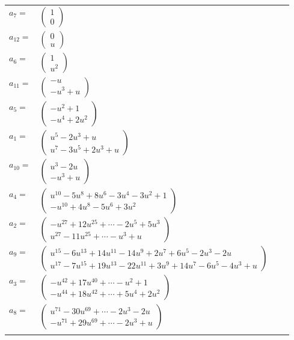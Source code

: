 \documentclass[1p]{elsarticle_modified}
\theoremstyle{definition}
\begin{document}
\begin{tabular}{m{7pt} m{180pt} m{7pt} m{180pt} }
\flushright $a_{7}=$&$\begin{pmatrix}1\\0\end{pmatrix}$ \\
\flushright $a_{12}=$&$\begin{pmatrix}0\\u\end{pmatrix}$ \\
\flushright $a_{6}=$&$\begin{pmatrix}1\\u^2\end{pmatrix}$ \\
\flushright $a_{11}=$&$\begin{pmatrix}- u\\- u^3+u\end{pmatrix}$ \\
\flushright $a_{5}=$&$\begin{pmatrix}- u^2+1\\- u^4+2 u^2\end{pmatrix}$ \\
\flushright $a_{1}=$&$\begin{pmatrix}u^5-2 u^3+u\\u^7-3 u^5+2 u^3+u\end{pmatrix}$ \\
\flushright $a_{10}=$&$\begin{pmatrix}u^3-2 u\\- u^3+u\end{pmatrix}$ \\
\flushright $a_{4}=$&$\begin{pmatrix}u^{10}-5 u^8+8 u^6-3 u^4-3 u^2+1\\- u^{10}+4 u^8-5 u^6+3 u^2\end{pmatrix}$ \\
\flushright $a_{2}=$&$\begin{pmatrix}- u^{27}+12 u^{25}+\cdots-2 u^5+5 u^3\\u^{27}-11 u^{25}+\cdots- u^3+u\end{pmatrix}$ \\
\flushright $a_{9}=$&$\begin{pmatrix}u^{15}-6 u^{13}+14 u^{11}-14 u^9+2 u^7+6 u^5-2 u^3-2 u\\u^{17}-7 u^{15}+19 u^{13}-22 u^{11}+3 u^9+14 u^7-6 u^5-4 u^3+u\end{pmatrix}$ \\
\flushright $a_{3}=$&$\begin{pmatrix}- u^{42}+17 u^{40}+\cdots- u^2+1\\- u^{44}+18 u^{42}+\cdots+5 u^4+2 u^2\end{pmatrix}$ \\
\flushright $a_{8}=$&$\begin{pmatrix}u^{71}-30 u^{69}+\cdots-2 u^3-2 u\\- u^{71}+29 u^{69}+\cdots-2 u^3+u\end{pmatrix}$\\&\end{tabular}
\end{document}
